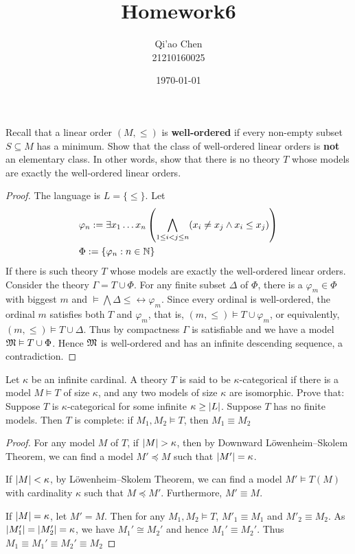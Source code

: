 \documentclass[11pt]{article}
\author{Qi'ao Chen\\21210160025}
\date{\today}
\title{Homework6}
\begin{document}
\maketitle
\begin{exercise}
Recall that a linear order \((M,\le)\) is \textbf{well-ordered} if every non-empty subset \(S\subseteq M\) has a
minimum. Show that the class of well-ordered linear orders is \textbf{not} an elementary class. In other
words, show that there is no theory \(T\) whose models are exactly the well-ordered linear orders.
\end{exercise}

\begin{proof}
The language is \(L=\{\le\}\). Let
\begin{align*}
&\varphi_n:=\exists x_1\dots x_n\left(\bigwedge_{1\le i<j\le n}(x_i\neq x_j\wedge x_i\le x_j)\right)\\
&\Phi:=\{\varphi_n:n\in\mathbb{N}\}
\end{align*}
If there is such theory \(T\) whose models are exactly the well-ordered linear orders. Consider the
theory \(\Gamma=T\cup\Phi\). For any finite subset \(\Delta\) of \(\Phi\), there is a \(\varphi_m\in\Phi\) with biggest \(m\) and
\(\vDash\bigwedge\Delta\le\leftrightarrow\varphi_m\). Since every ordinal is well-ordered, the ordinal \(m\) satisfies both \(T\)
and \(\varphi_m\), that is, \((m,\le)\vDash T\cup\varphi_m\), or equivalently, \((m,\le)\vDash T\cup\Delta\). Thus by compactness \(\Gamma\) is
satisfiable and we have a model \(\mathfrak{M}\vDash T\cup \Phi\). Hence \(\mathfrak{M}\) is well-ordered and has an infinite
descending sequence, a contradiction.
\end{proof}

\begin{exercise}
Let \(\kappa\) be an infinite cardinal. A theory \(T\) is said to be \(\kappa\)-categorical if there is a
model \(M\vDash T\) of size \(\kappa\), and any two models of size \(\kappa\) are isomorphic. Prove that: Suppose \(T\) is
\(\kappa\)-categorical for some infinite \(\kappa\ge\abs{L}\). Suppose \(T\) has no finite models. Then \(T\) is
complete: if \(M_1,M_2\vDash T\), then \(M_1\equiv M_2\)
\end{exercise}

\begin{proof}
For any model \(M\) of \(T\), if \(\abs{M}>\kappa\), then by Downward Löwenheim–Skolem Theorem, we can
find a model \(M'\preceq M\) such that \(\abs{M'}=\kappa\).

If \(\abs{M}<\kappa\), by Löwenheim–Skolem Theorem, we can find a model \(M'\vDash T(M)\) with cardinality
\(\kappa\) such that \(M\preceq M'\). Furthermore, \(M'\equiv M\).

If \(\abs{M}=\kappa\), let \(M'=M\). Then for any \(M_1,M_2\vDash T\), \(M'_1\equiv M_1\) and \(M'_2\equiv M_2\).
As \(\abs{M_1'} =\abs{M_2'} =\kappa\), we have \(M_1'\cong M_2'\) and hence \(M_1'\equiv M_2'\). Thus
\(M_1\equiv M_1'\equiv M_2'\equiv M_2\)
\end{proof}
\end{document}
